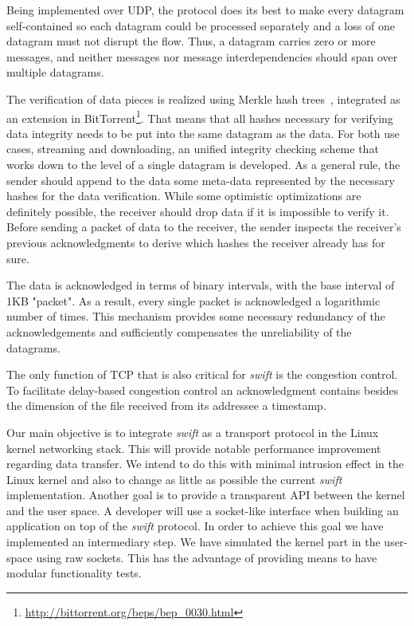 Being implemented over UDP, the protocol does its best to make every datagram
self-contained so each datagram could be processed separately and a loss of
one datagram must not disrupt the flow. Thus, a datagram carries zero or more
messages, and neither messages nor message interdependencies should span over
multiple datagrams.

The verification of data pieces is realized using Merkle hash
trees~\cite{merkle}, integrated as an extension in
BitTorrent\footnote{\url{http://bittorrent.org/beps/bep\_0030.html}}. That means
that all hashes necessary for verifying data integrity needs to be put into
the same datagram as the data. For both use cases, streaming and downloading,
an unified  integrity checking scheme that works down to the level of a single
datagram is developed. As a general rule, the sender should append to the data
some meta-data represented by the necessary hashes for the data verification.
While some optimistic optimizations are definitely possible, the receiver
should drop data if it is impossible to verify it. Before sending a packet of
data to the receiver, the sender inspects the receiver's previous
acknowledgments to derive which hashes the receiver already has for sure.

The data is acknowledged in terms of binary intervals, with the base interval
of 1KB "packet". As a result, every single packet is acknowledged a logarithmic
number of times. This mechanism provides some necessary redundancy of the
acknowledgements and sufficiently compensates the unreliability of the
datagrams.

The only function of TCP that is also critical for \textit{swift} is the
congestion control. To facilitate delay-based congestion control an
acknowledgment contains besides the dimension of the file received from its
addressee a timestamp.

Our main objective is to integrate \textit{swift} as a transport protocol in
the Linux kernel networking stack. This will provide notable performance
improvement regarding data transfer. We intend to do this with minimal
intrusion effect in the Linux kernel and also to change as little as possible
the current \textit{swift} implementation. Another goal is to provide a
transparent API between the kernel and the user space. A developer will use a
socket-like interface when building an application on top of the
\textit{swift} protocol. In order to achieve this goal we have implemented an
intermediary step. We have simulated the kernel part in the user-space using
raw sockets. This has the advantage of providing means to have modular
functionality tests.

